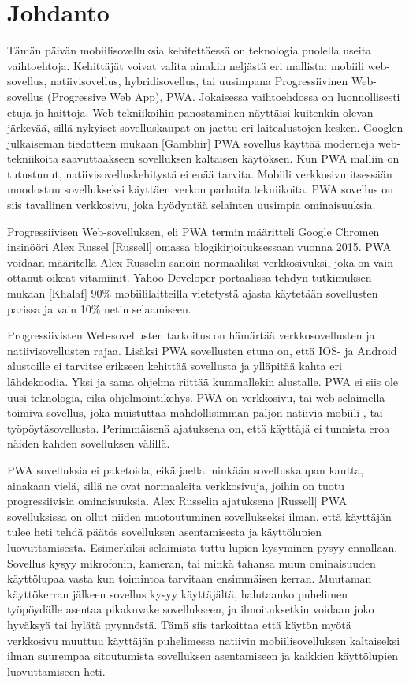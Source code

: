 \documentclass{tktltiki}
\begin{document}
\mytableofcontents

\section{Johdanto}

Tämän päivän mobiilisovelluksia kehitettäessä on teknologia puolella useita vaihtoehtoja. Kehittäjät voivat valita ainakin neljästä eri mallista: mobiili web-sovellus, natiivisovellus, hybridisovellus, tai uusimpana Progressiivinen Web-sovellus (Progressive Web App), PWA. Jokaisessa vaihtoehdossa on luonnollisesti etuja ja haittoja. Web tekniikoihin panostaminen näyttäisi kuitenkin olevan järkevää, sillä nykyiset sovelluskaupat on jaettu eri laitealustojen kesken. Googlen julkaiseman tiedotteen mukaan [Gambhir] PWA sovellus käyttää moderneja web-tekniikoita saavuttaakseen sovelluksen kaltaisen käytöksen. Kun PWA malliin on tutustunut, natiivisovelluskehitystä ei enää tarvita. Mobiili verkkosivu itsessään muodostuu sovellukseksi käyttäen verkon parhaita tekniikoita. PWA sovellus on siis tavallinen verkkosivu, joka hyödyntää selainten uusimpia ominaisuuksia.

Progressiivisen Web-sovelluksen, eli PWA termin määritteli Google Chromen insinööri Alex Russel [Russell] omassa blogikirjoituksessaan vuonna 2015. PWA voidaan määritellä Alex Russelin sanoin normaaliksi verkkosivuksi, joka on vain ottanut oikeat vitamiinit. Yahoo Developer portaalissa tehdyn tutkimuksen mukaan [Khalaf] 90\% mobiililaitteilla vietetystä ajasta käytetään sovellusten parissa ja vain 10\% netin selaamiseen. 

Progressiivisten Web-sovellusten tarkoitus on hämärtää verkkosovellusten ja natiivisovellusten rajaa. Lisäksi PWA sovellusten etuna on, että IOS- ja Android alustoille ei tarvitse erikseen kehittää sovellusta ja ylläpitää kahta eri lähdekoodia. Yksi ja sama ohjelma riittää kummallekin alustalle. PWA ei siis ole uusi teknologia, eikä ohjelmointikehys. PWA on verkkosivu, tai web-selaimella toimiva sovellus, joka muistuttaa mahdollisimman paljon natiivia mobiili-, tai työpöytäsovellusta. Perimmäisenä ajatuksena on, että käyttäjä ei tunnista eroa näiden kahden sovelluksen välillä.

PWA sovelluksia ei paketoida, eikä jaella minkään sovelluskaupan kautta, ainakaan vielä, sillä ne ovat normaaleita verkkosivuja, joihin on tuotu progressiivisia ominaisuuksia. Alex  Russelin ajatuksena [Russell] PWA sovelluksissa on ollut niiden muotoutuminen sovellukseksi ilman, että käyttäjän tulee heti tehdä päätös sovelluksen asentamisesta ja käyttölupien luovuttamisesta. Esimerkiksi selaimista tuttu lupien kysyminen pysyy ennallaan. Sovellus kysyy mikrofonin, kameran, tai minkä tahansa muun ominaisuuden käyttölupaa vasta kun toimintoa tarvitaan ensimmäisen kerran. Muutaman käyttökerran jälkeen sovellus kysyy käyttäjältä, halutaanko puhelimen työpöydälle asentaa pikakuvake sovellukseen, ja ilmoituksetkin voidaan joko hyväksyä tai hylätä pyynnöstä. Tämä siis tarkoittaa että käytön myötä verkkosivu muuttuu käyttäjän puhelimessa natiivin mobiilisovelluksen kaltaiseksi ilman suurempaa sitoutumista sovelluksen asentamiseen ja kaikkien käyttölupien luovuttamiseen heti. 
\end{document}
